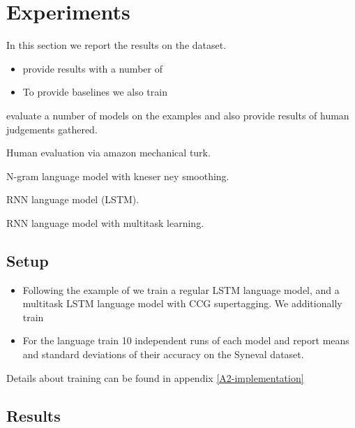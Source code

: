 

\section{Experiments}

In this section we report the results on the dataset.

\begin{itemize}
  \item \citet{linzen2018targeted} provide results with a number of
  \item To provide baselines we also train
\end{itemize}

evaluate a number of models on the examples and also provide results of human judgements gathered.
  \item Human evaluation via amazon mechanical turk.
  \item N-gram language model with kneser ney smoothing.
  \item RNN language model (LSTM).
  \item RNN language model with multitask learning.

\subsection{Setup}
\begin{itemize}
  \item Following the example of \citet{linzen2018targeted} we train a regular LSTM language model, and a multitask LSTM language model with CCG supertagging. We additionally train
  \item For the language train 10 independent runs of each model and report means and standard deviations of their accuracy on the Syneval dataset.
  \
\end{itemize}

Details about training can be found in appendix \ref{A2-implementation}

\subsection{Results}
